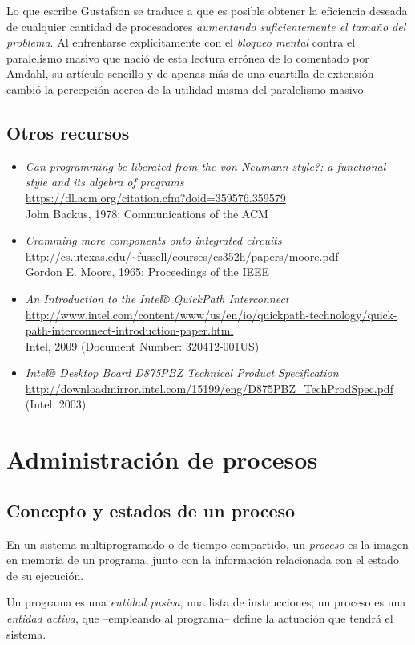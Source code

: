 \documentclass[11pt,fleqn]{book} %
\newcommand{\otrorec}[1]{ \\ {\small \url{#1}} \\ }
\begin{document}
Lo que escribe Gustafson se traduce a que es posible obtener la
eficiencia deseada de cualquier cantidad de procesadores \emph{aumentando suficientemente el tamaño del problema}. Al enfrentarse explícitamente
con el \emph{bloqueo mental} contra el paralelismo masivo que nació de esta
lectura errónea de lo comentado por Amdahl, su artículo sencillo y de
apenas más de una cuartilla de extensión cambió la percepción acerca
de la utilidad misma del paralelismo masivo.
\section{Otros recursos}
\label{sec-2-10}


\begin{itemize}
\item \emph{Can programming be liberated from the von Neumann style?: a   functional style and its algebra of programs}
  \otrorec{https://dl.acm.org/citation.cfm?doid=359576.359579}
  John Backus, 1978; Communications of the ACM
\item \emph{Cramming more components onto integrated circuits}
  \otrorec{http://cs.utexas.edu/~fussell/courses/cs352h/papers/moore.pdf}
  Gordon E. Moore, 1965; Proceedings of the IEEE
\item \emph{An Introduction to the Intel® QuickPath Interconnect}
  \otrorec{http://www.intel.com/content/www/us/en/io/quickpath-technology/quick-path-interconnect-introduction-paper.html}
  Intel, 2009 (Document Number: 320412-001US)
\item \emph{Intel® Desktop Board D875PBZ Technical Product Specification}
  \otrorec{http://downloadmirror.intel.com/15199/eng/D875PBZ_TechProdSpec.pdf}
  (Intel, 2003)
\end{itemize}
\chapter{Administración de procesos}
\label{sec-3}
\section{Concepto y estados de un proceso}
\label{sec-3-1}
\label{PROC}


En un sistema multiprogramado o de tiempo compartido, un \emph{proceso} es
la imagen en memoria de un programa, junto con la información
relacionada con el estado de su ejecución.

Un programa es una \emph{entidad pasiva}, una lista de instrucciones; un
proceso es una \emph{entidad activa}, que –empleando al programa– define la
actuación que tendrá el sistema.
\end{document}
